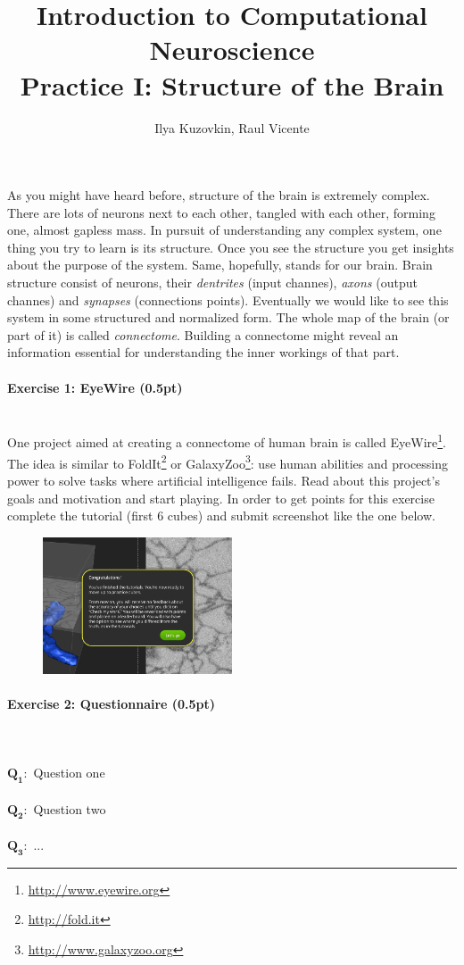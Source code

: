 \documentclass[a4paper,11pt]{article}
\author{\large{Ilya Kuzovkin, Raul Vicente}}
\title{\huge{Introduction to Computational Neuroscience}\\\LARGE{Practice I: Structure of the Brain}}
\newenvironment{exercise}[3]{\paragraph{Exercise #1: #2 (#3pt)}\ \\}{
\medskip}
\newcommand{\question}[2]{\setlength\parindent{0mm}\ \\$\mathbf{Q_#1:}$ #2\ \\}
\begin{document}
\maketitle

As you might have heard before, structure of the brain is extremely complex. There are lots of neurons next to each other, tangled with each other, forming one, almost gapless mass. In pursuit of understanding any complex system, one thing you try to learn is its structure. Once you see the structure you get insights about the purpose of the system. Same, hopefully, stands for our brain. Brain structure consist of neurons, their \emph{dentrites} (input channes), \emph{axons} (output channes) and \emph{synapses} (connections points). Eventually we would like to see this system in some structured and normalized form. The whole map of the brain (or part of it) is called \emph{connectome}. Building a connectome might reveal an information essential for understanding the inner workings of that part. 

\begin{exercise}{1}{EyeWire}{0.5}
One project aimed at creating a connectome of human brain is called EyeWire\footnote{\url{http://www.eyewire.org}}. The idea is similar to FoldIt\footnote{\url{http://fold.it}} or GalaxyZoo\footnote{\url{http://www.galaxyzoo.org}}: use human abilities and processing power to solve tasks where artificial intelligence fails. Read about this project's goals and motivation and start playing. In order to get points for this exercise complete the tutorial (first 6 cubes) and submit screenshot like the one below.
\begin{figure}[htbp]
   \centering
   \includegraphics[width=0.5\textwidth]{eyewire.png} 
\end{figure}
\end{exercise}

\begin{exercise}{2}{Questionnaire}{0.5}
\question{1}{Question one}
\question{2}{Question two}
\question{3}{...}
\end{exercise}
\end{document}
